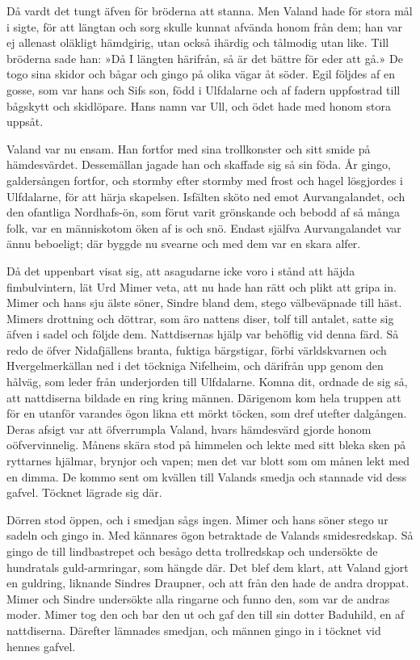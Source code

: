 Då vardt det tungt äfven för bröderna att stanna. Men Valand hade för
stora mål i sigte, för att längtan och sorg skulle kunnat afvända honom
från dem; han var ej allenast
oläkligt hämdgirig, utan också ihärdig och tålmodig utan like. Till
bröderna sade han: »Då I längten härifrån, så är det bättre för eder att
gå.» De togo sina skidor och bågar och gingo på olika vägar åt söder.
Egil följdes af en gosse, som var hans och Sifs son, född i Ulfdalarne
och af fadern uppfostrad till bågskytt och skidlöpare. Hans namn var
Ull, och ödet hade med honom stora uppsåt.

Valand var nu ensam. Han fortfor med sina trollkonster och sitt smide på
hämdesvärdet. Dessemällan jagade han och skaffade sig så sin föda. År
gingo, galdersången fortfor, och stormby efter stormby med frost och
hagel lösgjordes i Ulfdalarne, för att härja skapelsen. Isfälten sköto
ned emot Aurvangalandet, och den ofantliga Nordhafs-ön, som förut varit
grönskande och bebodd af så många folk, var en människotom öken af is
och snö. Endast själfva Aurvangalandet var ännu beboeligt; där byggde nu
svearne och med dem var en skara alfer.

Då det uppenbart visat sig, att asagudarne icke voro i stånd att häjda
fimbulvintern, lät Urd Mimer veta, att nu hade han rätt och plikt att
gripa in. Mimer och hans sju älste söner, Sindre bland dem, stego
välbeväpnade till häst. Mimers drottning och döttrar, som äro nattens
diser, tolf till antalet, satte sig äfven i sadel och följde dem.
Nattdisernas hjälp var behöflig vid denna färd. Så redo de öfver
Nidafjällens branta, fuktiga bärgstigar, förbi världskvarnen och
Hvergelmerkällan ned i det töckniga Nifelheim, och därifrån upp genom
den hålväg, som leder från underjorden till Ulfdalarne. Komna dit,
ordnade de sig så, att nattdiserna bildade en ring kring männen.
Därigenom kom hela truppen att för en utanför varandes ögon likna ett
mörkt töcken, som dref utefter dalgången. Deras afsigt var att
öfverrumpla Valand, hvars hämdesvärd gjorde honom oöfvervinnelig. Månens
skära stod på himmelen och lekte med sitt bleka sken på ryttarnes
hjälmar, brynjor och vapen; men det var blott som om månen lekt med en
dimma. De kommo sent om kvällen till Valands smedja och stannade vid
dess gafvel. Töcknet lägrade sig där.

Dörren stod öppen, och i smedjan sågs ingen. Mimer och hans söner stego
ur sadeln och gingo in. Med kännares ögon betraktade de Valands
smidesredskap. Så gingo de till lindbastrepet och besågo detta
trollredskap och undersökte de hundratals guld-armringar, som hängde
där. Det blef dem klart, att Valand gjort en guldring, liknande Sindres
Draupner, och att från den hade de andra droppat. Mimer och Sindre
undersökte alla ringarne och funno den, som var de andras moder. Mimer
tog den och bar den ut och gaf den till sin dotter Baduhild, en af
nattdiserna. Därefter lämnades smedjan, och männen gingo in i töcknet
vid hennes gafvel.

